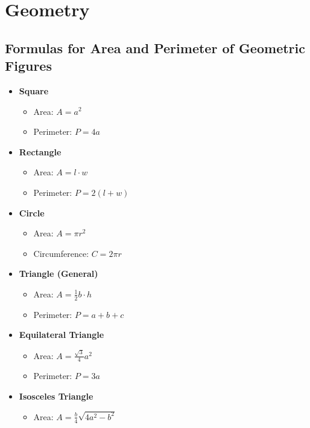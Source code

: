 \chapter{Geometry}

\section{Formulas for Area and Perimeter of Geometric Figures}

\begin{itemize}
	
	\item \textbf{Square}
	      \begin{itemize}
		      \item Area: \(A = a^2\)
		      \item Perimeter: \(P = 4a\)
	      \end{itemize}

	\item \textbf{Rectangle}
	      \begin{itemize}
		      \item Area: \(A = l \cdot w\)
		      \item Perimeter: \(P = 2(l + w)\)
	      \end{itemize}

	\item \textbf{Circle}
	      \begin{itemize}
		      \item Area: \(A = \pi r^2\)
		      \item Circumference: \(C = 2\pi r\)
	      \end{itemize}

	\item \textbf{Triangle (General)}
	      \begin{itemize}
		      \item Area: \(A = \frac{1}{2} b \cdot h\)
		      \item Perimeter: \(P = a + b + c\)
	      \end{itemize}

	\item \textbf{Equilateral Triangle}
	      \begin{itemize}
		      \item Area: \(A = \frac{\sqrt{3}}{4} a^2\)
		      \item Perimeter: \(P = 3a\)
	      \end{itemize}

	\item \textbf{Isosceles Triangle}
	      \begin{itemize}
		      \item Area: \(A = \frac{b}{4} \sqrt{4a^2 - b^2}\)
	      \end{itemize}


\end{itemize}

